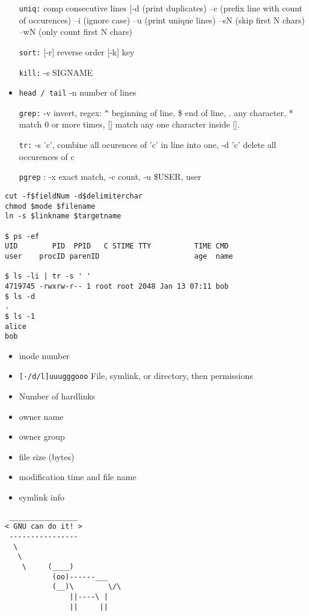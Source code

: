 \documentclass[10pt, a4paper, leqno]{article}
\providecommand{\tightlist}{%
  \setlength{\itemsep}{0pt}\setlength{\parskip}{0pt}}
\begin{document}
\begin{multicols}{2}
\begin{itemize}
    \tightlist
    \item[\texttt{uniq:}] comp consecutive lines [-d (print duplicates) –c (prefix line with count of
occurences) –i (ignore case) –u (print unique lines) –sN (skip first N chars) –wN (only count
first N chars)
\item [\texttt{sort:}] [-r] reverse order [-k] key
\item [\texttt{kill:}] -s SIGNAME
\item \texttt{head / tail} -n number of lines
\item [\texttt{grep:}] -v invert, regex: \texttt{\^} beginning of line, \$ end of line, . any character, * match 0 or more times, [] match any one character inside []. 
\item [\texttt{tr:}] -s 'c', combine all ocurences of 'c' in line into one, -d 'c' delete all occurences of c
\item [\texttt{pgrep}]: -x exact match, -c count, -u \$USER, user
\end{itemize}

\begin{verbatim} 
cut -f$fieldNum -d$delimiterchar 
chmod $mode $filename
ln -s $linkname $targetname 

$ ps -ef
UID        PID  PPID   C STIME TTY          TIME CMD
user    procID parenID                      age  name

$ ls -li | tr -s ' '
4719745 -rwxrw-r-- 1 root root 2048 Jan 13 07:11 bob 
$ ls -d 
.
$ ls -1
alice
bob
\end{verbatim}

\begin{itemize}
    \tightlist
    \item inode number
    \item  \texttt{[-/d/l]uuugggooo} File, symlink, or directory, then permissions 
        \item Number of hardlinks
        \item owner name
        \item owner group
        \item file size (bytes)
        \item modification time and file name
        \item symlink info
\end{itemize}

\begin{verbatim}
 ________________
< GNU can do it! >
 ----------------
  \
   \     
    \     (____)
           (oo)------___
           (__)\        \/\
               ||----\ |
               ||     ||

\end{verbatim}

\end{multicols}
\end{document}
